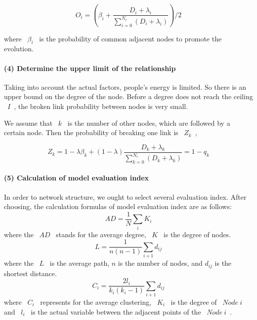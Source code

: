 \documentclass[a4paper,11pt]{article}
\begin{document}
\begin{equation}
{O_i} = ({\beta _i} + \frac{{{D_i} + {\lambda _i}}}{{\sum\limits_{i = 0}^{{N_r}} {({D_i} + {\lambda _i})} }})/2
\end{equation}



where ~$\beta_i$~ is the probability of common adjacent nodes to promote the evolution.





\paragraph{(4) Determine the upper limit of the relationship}
\text{\\}
\par Taking into account the actual factors, people's energy is limited. So there is an upper bound on the degree of the node. Before a degree does not reach the ceiling ~$I$~, the broken link probability between nodes is very small.
\par We assume that ~$k$~ is the number of other nodes, which are followed by a certain node. Then the probability of breaking one link is ~$Z_k$~,

\begin{equation}
{Z_k}=1-\lambda \beta _k+(1-\lambda ){\frac{{{D_k} + {\lambda _k}}}{{\sum\limits_{k = 0}^{{N_r}} {({D_k} + {\lambda _k})} }}}=1-q_k
\end{equation}



\paragraph{(5) Calculation of model evaluation index}
\text{\\}
\par In order to network structure, we ought to select several evaluation index. After choosing, the calculation formulas of model evaluation index are as follows:
\begin{equation}
AD=\frac{1}{N}{\sum\limits_{i}^{}}{K_i}
\end{equation}
where the ~$AD$~ stands for the average degree, ~$K$~ is the degree of nodes.
\begin{equation}
L=\frac{1}{n(n-1)}{\sum\limits_{i+1}^{}}{d_{ij}}
\end{equation}
where the ~$L$~ is the average path, $n$ is the number of nodes, and $d_{ij}$ is the shortest distance.
\begin{equation}
C_i=\frac{2l_i}{k_i(k_i-1)}{\sum\limits_{i+1}^{}}{d_{ij}}
\end{equation}
where ~$C_i$~ represents for the average clustering, ~$K_i$~ is the degree of ~$Node~i$~ and ~$l_i$~ is the actual variable between the adjacent points of the ~$Node~i$~.
\end{document}
